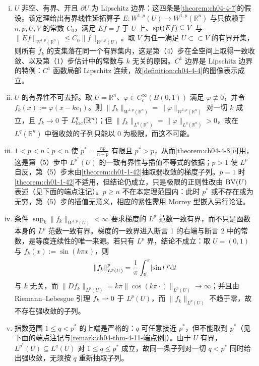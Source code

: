 ﻿\documentclass[../../main.tex]{subfiles}%
\begin{document}
\begin{remark}\label{remark:ch04-thm-4-11-条件}
\begin{enumerate}[(i)]
\item $U$ 非空、有界、开且 $\partial U$ 为 Lipschitz 边界：这四条是\cref{theorem:ch04-4-7}的假设。该定理给出有界线性延拓算子 $E:W^{1,p}(U)\to W^{1,p}(\mathbb{R}^n)$ 与只依赖于 $n,p,U,V$ 的常数 $C_0$，满足 $Ef=f$ 于 $U$ 上、$\operatorname{spt}(Ef)\subseteq V$ 与 $\lVert Ef\rVert_{W^{1,p}(\mathbb{R}^n)}\leqslant C_0\lVert f\rVert_{W^{1,p}(U)}$。取 $V$ 为任一满足 $U\subset\subset V$ 的有界开集，则所有 $\bar f_k$ 的支集落在同一个有界集内，这是第（4）步在全空间上取得一致收敛、以及第（1）步估计中的常数与 $k$ 无关的原因。$C^1$ 边界是 Lipschitz 边界的特例：$C^1$ 函数局部 Lipschitz 连续，故\cref{definition:ch04-4-4}的图像表示成立。%
\item $U$ 的有界性不可去掉。取 $U=\mathbb{R}^n$、$\varphi\in C_c^\infty(B(0,1))$ 满足 $\varphi\not\equiv0$，并令 $f_k(x):=\varphi(x-ke_1)$。则 $\lVert f_k\rVert_{W^{1,p}(\mathbb{R}^n)}=\lVert\varphi\rVert_{W^{1,p}(\mathbb{R}^n)}$ 对一切 $k$ 成立，且 $f_k\to0$ 于 $L^q_{\mathrm{loc}}(\mathbb{R}^n)$；但 $\lVert f_k\rVert_{L^q(\mathbb{R}^n)}=\lVert\varphi\rVert_{L^q(\mathbb{R}^n)}>0$，故在 $L^q(\mathbb{R}^n)$ 中强收敛的子列只能以 $0$ 为极限，而这不可能。
\item $1<p<n$：$p<n$ 使 $p^*=\frac{np}{n-p}$ 有限且 $p^*>p$，从而\cref{theorem:ch04-4-8}可用，这是第（5）步中 $L^{p^*}(U)$ 的一致有界性与插值不等式的依据；$p>1$ 使 $L^p$ 自反，第（5）步末由\cref{theorem:ch01-1-42}抽取弱收敛的梯度子列。$p=1$ 时\cref{theorem:ch01-1-42}不适用，但结论仍成立，只是极限的正则性改由 $\mathrm{BV}(U)$ 表述（见下面的端点注记）。$p\geqslant n$ 不在本定理范围内：此时 $p^*$ 或不存在或为无穷，第（5）步的插值无意义，相应的紧性需用 Morrey 型嵌入另行论证。%
\item 条件 $\sup_k\lVert f_k\rVert_{W^{1,p}(U)}<\infty$ 要求梯度的 $L^p$ 范数一致有界，而不只是函数本身的 $L^p$ 范数一致有界。梯度的一致界进入断言 1 的右端与断言 2 中的常数，是等度连续性的唯一来源。若只有 $L^p$ 界，结论不成立：取 $U=(0,1)$ 与 $f_k(x):=\sin(k\pi x)$，则
\begin{align*}
\lVert f_k\rVert^p_{L^p(U)}=\frac{1}{\pi}\int_0^{\pi}\lvert\sin t\rvert^p\mathrm{d} t
\end{align*}
与 $k$ 无关，而 $\lVert Df_k\rVert_{L^p(U)}=k\pi\lVert\cos(k\pi\cdot)\rVert_{L^p(U)}\to\infty$；并且由 Riemann--Lebesgue 引理 $f_k\rightharpoonup0$ 于 $L^p(U)$，而 $\lVert f_k\rVert_{L^p(U)}$ 不趋于零，故不存在强收敛的子列。
\item 指数范围 $1\leqslant q<p^*$ 的上端是严格的：$q$ 可任意接近 $p^*$，但不能取到 $p^*$（见下面的端点注记与\cref{remark:ch04-thm-4-11-端点例}）。由于 $U$ 有界，$L^{p^*}(U)\subseteq L^q(U)$ 对 $1\leqslant q\leqslant p^*$ 成立，故同一条子列对一切 $q<p^*$ 同时给出强收敛，无须按 $q$ 重新抽取子列。%
\end{enumerate}
\end{remark}
\end{document}
